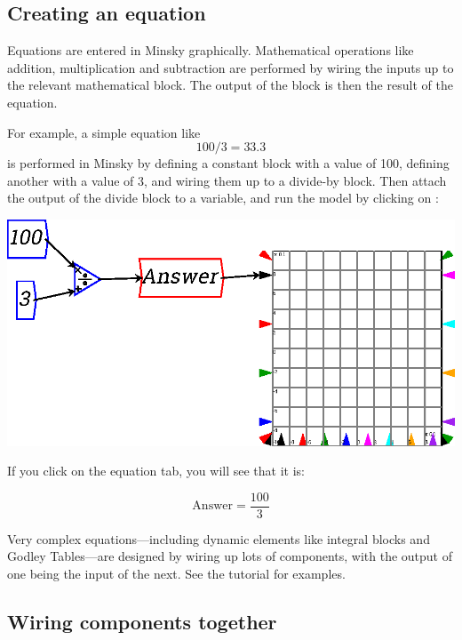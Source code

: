 \subsection{Creating an equation}

Equations are entered in Minsky graphically. Mathematical operations
like addition, multiplication and subtraction are performed by wiring
the inputs up to the relevant mathematical block. The output of the
block is then the result of the equation. 

For example, a simple equation like
\begin{displaymath}
100/3 = 33.3
\end{displaymath}
is performed in Minsky by defining a constant block with a value of 100, defining another with a value of 3, and wiring them up to a divide-by block. Then attach the output of the divide block to a variable, and run the model by clicking on :

\begin{center}
  \includegraphics{images/NewItem129.eps}
\end{center}

If you click on the equation tab, you will see that it is:

\begin{displaymath}
\mathrm{Answer}=\frac{100}{3}
\end{displaymath}

Very complex equations---including dynamic elements like integral
blocks and Godley Tables---are designed by wiring up lots of
components, with the output of one being the input of the next. See
the tutorial for examples.

\subsection{Wiring components together}


